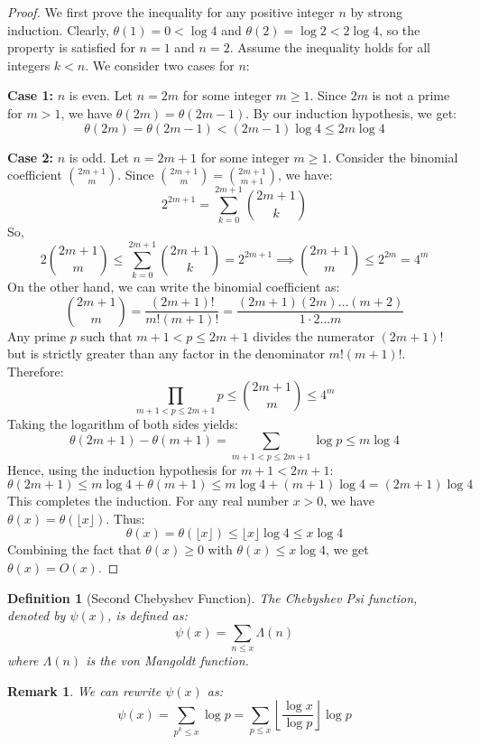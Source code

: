 \documentclass[a4paper]{article}
\newtheorem{definition}[theorem]{Definition}
\newtheorem{remark}[theorem]{Remark}
\begin{document}
\begin{proof}
  We first prove the inequality for any positive integer $n$ by
  strong induction.
  Clearly, $\theta(1) = 0 < \log 4$ and $\theta(2) = \log 2 < 2 \log
  4$, so the property is satisfied for $n=1$ and $n=2$.
  Assume the inequality holds for all integers $k < n$. We consider
  two cases for $n$:

  \textbf{Case 1:} $n$ is even.
  Let $n = 2m$ for some integer $m \ge 1$. Since $2m$ is not a prime
  for $m > 1$, we have $\theta(2m) = \theta(2m-1)$. By our induction
  hypothesis, we get:
  \[ \theta(2m) = \theta(2m-1) < (2m-1) \log 4 \le 2m \log 4 \]

  \textbf{Case 2:} $n$ is odd.
  Let $n = 2m+1$ for some integer $m \ge 1$. Consider the binomial
  coefficient $\binom{2m+1}{m}$. Since $\binom{2m+1}{m} =
  \binom{2m+1}{m+1}$, we have:
  \[ 2^{2m+1} = \sum_{k=0}^{2m+1} \binom{2m+1}{k} \]
  So,
  \[ 2 \binom{2m+1}{m} \le \sum_{k=0}^{2m+1} \binom{2m+1}{k} =
  2^{2m+1} \implies \binom{2m+1}{m} \le 2^{2m} = 4^m \]
  On the other hand, we can write the binomial coefficient as:
  \[ \binom{2m+1}{m} = \frac{(2m+1)!}{m!(m+1)!} = \frac{(2m+1)(2m)
  \dots (m+2)}{1 \cdot 2 \dots m} \]
  Any prime $p$ such that $m+1 < p \le 2m+1$ divides the numerator
  $(2m+1)!$ but is strictly greater than any factor in the
  denominator $m!(m+1)!$. Therefore:
  \[ \prod_{m+1 < p \le 2m+1} p \le \binom{2m+1}{m} \le 4^m \]
  Taking the logarithm of both sides yields:
  \[ \theta(2m+1) - \theta(m+1) = \sum_{m+1 < p \le 2m+1} \log p \le m \log 4 \]
  Hence, using the induction hypothesis for $m+1 < 2m+1$:
  \[ \theta(2m+1) \le m \log 4 + \theta(m+1) \le m \log 4 + (m+1)
  \log 4 = (2m+1) \log 4 \]
  This completes the induction. For any real number $x > 0$, we have
  $\theta(x) = \theta(\lfloor x \rfloor)$. Thus:
  \[ \theta(x) = \theta(\lfloor x \rfloor) \le \lfloor x \rfloor \log
  4 \le x \log 4 \]
  Combining the fact that $\theta(x) \ge 0$ with $\theta(x) \le x
  \log 4$, we get $\theta(x) = O(x)$.
\end{proof}

\begin{definition}[Second Chebyshev Function]
  The Chebyshev Psi function, denoted by $\psi(x)$, is defined as:
  \[ \psi(x) = \sum_{n \le x} \Lambda(n) \]
  where $\Lambda(n)$ is the von Mangoldt function.
\end{definition}

\begin{remark}
  We can rewrite $\psi(x)$ as:
  \[ \psi(x) = \sum_{p^k \le x} \log p = \sum_{p \le x} \left\lfloor
  \frac{\log x}{\log p} \right\rfloor \log p \]
\end{remark}
\end{document}
